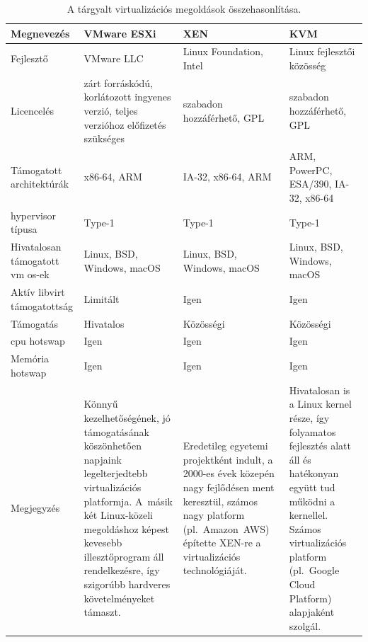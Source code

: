 \begin{table}[h!]
	\setlength{\tabcolsep}{5pt}
	\renewcommand{\arraystretch}{1.3}
	\centering
	\begin{tabular}{||p{3.25cm} p{3.25cm} p{3.25cm} p{3.25cm} ||}
		\hline
		Megnevezés & VMware ESXi & XEN & KVM \\
		\hline\hline
		Fejlesztő & VMware LLC & Linux Foundation, Intel & Linux fejlesztői közösség \\
		\hline
		Licencelés & zárt forráskódú, korlátozott ingyenes verzió, teljes verzióhoz előfizetés szükséges & szabadon hozzáférhető, GPL & szabadon hozzáférhető, GPL \\
		\hline
		Támogatott architektúrák & x86-64, ARM & IA-32, x86-64, ARM & ARM, PowerPC, ESA/390, IA-32, x86-64 \\
		\hline
		\Gls{hypervisor} típusa & Type-1 & Type-1 & Type-1 \\
		\hline
		Hivatalosan támogatott \acrshort{vm} \acrshort{os}-ek & Linux, BSD, Windows, macOS & Linux, BSD, Windows, macOS & Linux, BSD, Windows, macOS \\
		\hline
		Aktív \gls{libvirt} támogatottság & Limitált & Igen & Igen \\
		\hline
		Támogatás & Hivatalos & Közösségi & Közösségi  \\
		\hline
		\acrshort{cpu} \gls{hotswap} & Igen & Igen & Igen \\
		\hline
		Memória \gls{hotswap} & Igen & Igen & Igen \\
		\hline
		Megjegyzés & Könnyű kezelhetőségének, jó támogatásának köszönhetően napjaink legelterjedtebb virtualizációs platformja. A~másik két Linux-közeli megoldáshoz képest kevesebb illesztőprogram áll rendelkezésre, így szigorúbb hardveres követelményeket támaszt. & Eredetileg egyetemi projektként indult, a 2000-es évek közepén nagy fejlődésen ment keresztül, számos nagy platform (pl.~Amazon~AWS) építette XEN-re a virtualizációs technológiáját. & Hivatalosan is a Linux kernel része, így folyamatos fejlesztés alatt áll és hatékonyan együtt tud működni a kernellel. Számos virtualizációs platform (pl.~Google Cloud Platform) alapjaként szolgál.  \\
		\hline
	\end{tabular}
	\caption{A tárgyalt virtualizációs megoldások összehasonlítása.}
	\label{tab:hypervisor-comparison}
\end{table}


